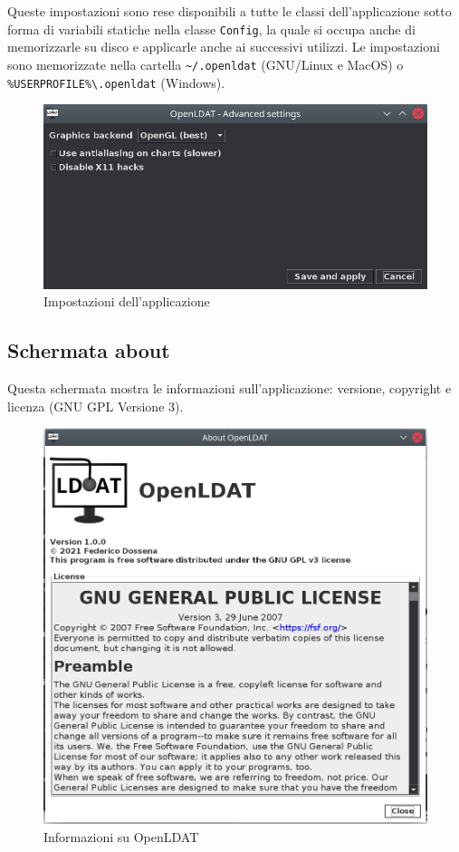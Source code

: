 Queste impostazioni sono rese disponibili a tutte le classi dell'applicazione sotto forma di variabili statiche nella classe \texttt{Config}, la quale si occupa anche di memorizzarle su disco e applicarle anche ai successivi utilizzi. Le impostazioni sono memorizzate nella cartella \texttt{\textasciitilde/.openldat} (GNU/Linux e MacOS) o \texttt{\%USERPROFILE\%\textbackslash.openldat} (Windows).

\begin{figure}[H]
	\centering
	\includegraphics[width=\textwidth]{Applicazione_files/gui_settings.png}
	\caption{Impostazioni dell'applicazione}
	\label{fig:gui_settings}
\end{figure}

\subsection{Schermata about}
Questa schermata mostra le informazioni sull'applicazione: versione, copyright e licenza (GNU GPL Versione 3).

\begin{figure}[H]
	\centering
	\includegraphics[width=.8\textwidth]{Applicazione_files/gui_about.png}
	\caption{Informazioni su OpenLDAT}
	\label{fig:gui_about}
\end{figure}

